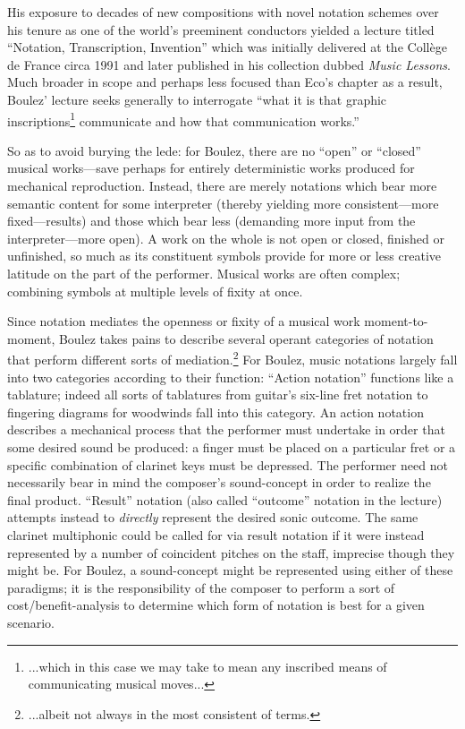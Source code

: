     His exposure to decades of new compositions with novel notation schemes over his tenure as one of the world's preeminent conductors yielded a lecture titled ``Notation, Transcription, Invention'' which was initially delivered at the Collège de France circa 1991 and later published in his collection dubbed \textit{Music Lessons}. Much broader in scope and perhaps less focused than Eco's chapter as a result, Boulez' lecture seeks generally to interrogate ``what it is that graphic inscriptions\footnote{...which in this case we may take to mean any inscribed means of communicating musical moves...} communicate and how that communication works.''
    
    So as to avoid burying the lede: for Boulez, there are no ``open'' or ``closed'' musical works---save perhaps for entirely deterministic works produced for mechanical reproduction. Instead, there are merely notations which bear more semantic content for some interpreter (thereby yielding more consistent---more fixed---results) and those which bear less (demanding more input from the interpreter---more open). A work on the whole is not open or closed, finished or unfinished, so much as its constituent symbols provide for more or less creative latitude on the part of the performer. Musical works are often complex; combining symbols at multiple levels of fixity at once.
    
    Since notation mediates the openness or fixity of a musical work moment-to-moment, Boulez takes pains to describe several operant categories of notation that perform different sorts of mediation.\footnote{...albeit not always in the most consistent of terms.} For Boulez, music notations largely fall into two categories according to their function: ``Action notation'' functions like a tablature; indeed all sorts of tablatures from guitar's six-line fret notation to fingering diagrams for woodwinds fall into this category. An action notation describes a mechanical process that the performer must undertake in order that some desired sound be produced: a finger must be placed on a particular fret or a specific combination of clarinet keys must be depressed. The performer need not necessarily bear in mind the composer's sound-concept in order to realize the final product. ``Result'' notation (also called ``outcome'' notation in the lecture) attempts instead to \textit{directly} represent the desired sonic outcome. The same clarinet multiphonic could be called for via result notation if it were instead represented by a number of coincident pitches on the staff, imprecise though they might be. For Boulez, a sound-concept might be represented using either of these paradigms; it is the responsibility of the composer to perform a sort of cost/benefit-analysis to determine which form of notation is best for a given scenario.
    
